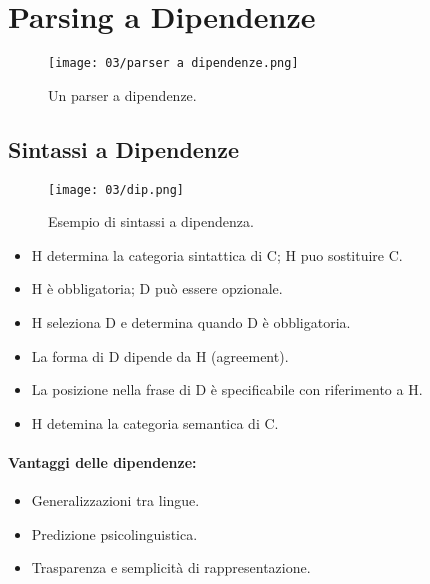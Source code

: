 
\section{Parsing a Dipendenze}

\begin{figure}[!h]
    \centering
    \texttt{[image: 03/parser a dipendenze.png]}
    \caption{Un parser a dipendenze.}
\end{figure}

\subsection{Sintassi a Dipendenze}



\begin{figure}[!h]
    \centering
    \texttt{[image: 03/dip.png]}
    \caption{Esempio di sintassi a dipendenza.}
\end{figure}


\begin{itemize}
  \item H determina la categoria sintattica di C; H puo sostituire C. 
  \item H è obbligatoria; D può essere opzionale. 
  \item H seleziona D e determina quando D è obbligatoria. 
  \item La forma di D dipende da H (agreement). 
  \item La posizione nella frase di D è specificabile con
riferimento a H. 
\item H detemina la categoria semantica di C.
\end{itemize}


\paragraph{Vantaggi delle dipendenze:}

\begin{itemize}
  \item Generalizzazioni tra lingue. 
  \item Predizione psicolinguistica.
  \item Trasparenza e semplicità di rappresentazione.
\end{itemize}





